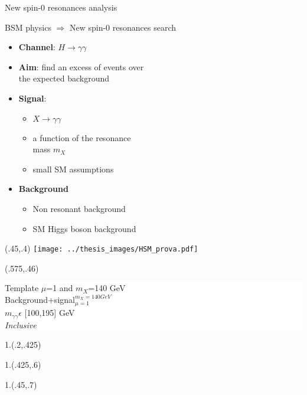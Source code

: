 \documentclass[10pt,UKenglish, leqno, xcolor = dvipsnames]{beamer}
\begin{document}
	\begin{frame}{New spin-0 resonances analysis}
		\vfill
		\begin{center}
			BSM physics $\Rightarrow$ New spin-0 resonances search
		\end{center}
		\begin{itemize}
			\item \textbf{Channel}: $H \to \gamma\gamma$
			\item \textbf{Aim}: find an excess of events over\\ the expected background
			\item \textbf{Signal}:
			\begin{itemize}
				\item $X \to \gamma\gamma$ 
				\item a function of the resonance\\ mass $m_X$
				\item small SM assumptions
			\end{itemize}
			\item \textbf{Background}
			\begin{itemize}
				\item Non resonant background
				\item SM Higgs boson background
			\end{itemize}
		\end{itemize}
		\vfill 
		\begin{textblock}{1}(.45,.4)
			\texttt{[image: ../thesis\_images/HSM\_prova.pdf]}
		\end{textblock}
		\begin{textblock}{1}(.575,.46)
			\colorbox{white}{
				\begin{minipage}{3.cm}
					\tiny
					Template $\mu$=1 and $m_X$=140 GeV\\
					Background+signal$_{\mu=1}^{m_X=140 GeV}$\\
					$m_{\gamma\gamma} \epsilon$ [100,195] GeV\\
					\textit{Inclusive}
				\end{minipage}
			}
		\end{textblock}
		
		\begin{textblock}{1.}(.2,.425)
		\end{textblock}
		\begin{textblock}{1.}(.425,.6)
		\end{textblock}
		\begin{textblock}{1.}(.45,.7)
		\end{textblock}
	\end{frame}
	
\end{document}
